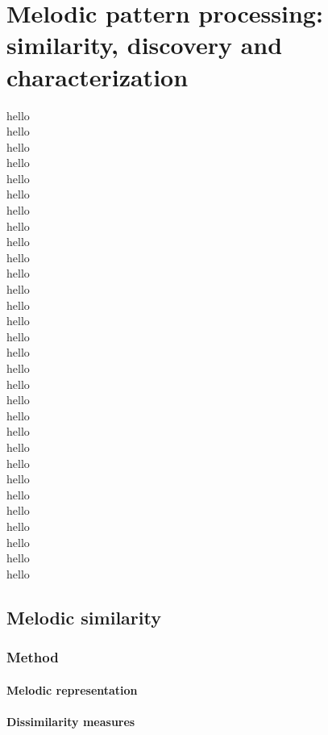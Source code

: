 
\chapter{Melodic pattern processing: similarity, discovery and characterization}

hello\\
hello\\
hello\\
hello\\
hello\\
hello\\
hello\\
hello\\
hello\\
hello\\
hello\\
hello\\
hello\\
hello\\
hello\\
hello\\
hello\\
hello\\
hello\\
hello\\
hello\\
hello\\
hello\\
hello\\
hello\\
hello\\
hello\\
hello\\
hello\\
hello\\

\section{Melodic similarity}

\subsection{Method}
\subsubsection{Melodic representation}
\subsubsection{Dissimilarity measures}
